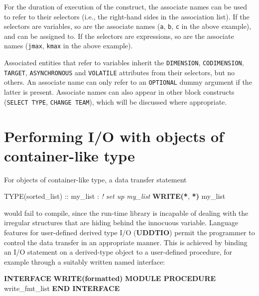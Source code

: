 \documentclass[
  paper=a4,
  ,captions=tableheading
]{scrartcl}
\newenvironment{Shaded}{\begin{snugshade}}{\end{snugshade}}
\newcommand{\CommentTok}[1]{\textcolor[rgb]{0.56,0.35,0.01}{\textit{#1}}}
\newcommand{\DataTypeTok}[1]{\textcolor[rgb]{0.13,0.29,0.53}{#1}}
\newcommand{\FunctionTok}[1]{\textcolor[rgb]{0.13,0.29,0.53}{\textbf{#1}}}
\newcommand{\KeywordTok}[1]{\textcolor[rgb]{0.13,0.29,0.53}{\textbf{#1}}}
\newcommand{\NormalTok}[1]{#1}
\begin{document}
For the duration of execution of the construct, the associate names can
be used to refer to their selectors (i.e., the right-hand sides in the
association list). If the selectors are variables, so are the associate
names (\texttt{a}, \texttt{b}, \texttt{c} in the above example), and can
be assigned to. If the selectors are expressions, so are the associate
names (\texttt{jmax}, \texttt{kmax} in the above example).

Associated entities that refer to variables inherit the
\texttt{DIMENSION}, \texttt{CODIMENSION}, \texttt{TARGET},
\texttt{ASYNCHRONOUS} and \texttt{VOLATILE} attributes from their
selectors, but no others. An associate name can only refer to an
\texttt{OPTIONAL} dummy argument if the latter is present. Associate
names can also appear in other block constructs (\texttt{SELECT\ TYPE},
\texttt{CHANGE\ TEAM}), which will be discussed where appropriate.

\section{Performing I/O with objects of container-like
type}\label{performing-io-with-objects-of-container-like-type}

For objects of container-like type, a data transfer statement

\begin{Shaded}
\begin{Highlighting}[]
\DataTypeTok{TYPE(sorted\_list)} \DataTypeTok{::}\NormalTok{ my\_list}
\NormalTok{: }\CommentTok{! set up my\_list}
\FunctionTok{WRITE(*}\NormalTok{, }\FunctionTok{*)}\NormalTok{ my\_list}
\end{Highlighting}
\end{Shaded}

would fail to compile, since the run-time library is incapable of
dealing with the irregular structures that are hiding behind the
innocuous variable. Language features for user-defined derived type I/O
(\textbf{UDDTIO}) permit the programmer to control the data transfer in
an appropriate manner. This is achieved by binding an I/O statement on a
derived-type object to a user-defined procedure, for example through a
suitably written named interface:

\begin{Shaded}
\begin{Highlighting}[]
\KeywordTok{INTERFACE} \FunctionTok{WRITE(formatted)}
   \KeywordTok{MODULE PROCEDURE}\NormalTok{ write\_fmt\_list}
\KeywordTok{END INTERFACE}
\end{Highlighting}
\end{Shaded}
\end{document}
